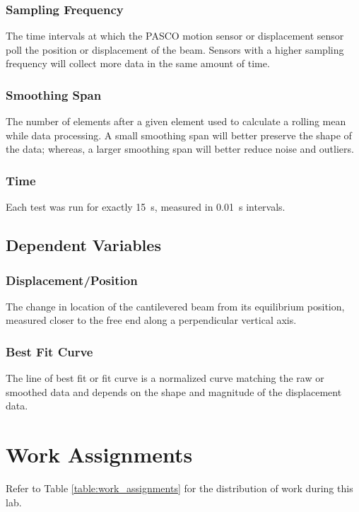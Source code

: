 \documentclass[12 pt]{report}
\begin{document}
\subsubsection{Sampling Frequency} \label{variables-independent_variables-sampling_frequency}
The time intervals at which the PASCO motion sensor or displacement sensor poll the position or displacement of the beam. Sensors with a higher sampling frequency will collect more data in the same amount of time.

\subsubsection{Smoothing Span} \label{variables-independent_variables-smoothing_span}
The number of elements after a given element used to calculate a rolling mean while data processing. A small smoothing span will better preserve the shape of the data; whereas, a larger smoothing span will better reduce noise and outliers.

\subsubsection{Time} \label{variables-independent_variables-time}
Each test was run for exactly \qty{15}{\s}, measured in \qty{0.01}{\s} intervals.

\subsection{Dependent Variables} \label{variables-dependent_variables}
\subsubsection{Displacement/Position} \label{variables-dependent_variables-displacement-position}
The change in location of the cantilevered beam from its equilibrium position, measured closer to the free end along a perpendicular vertical axis.

\subsubsection{Best Fit Curve} \label{variables-dependent_variablesbest_fit_curve}
The line of best fit or fit curve is a normalized curve matching the raw or smoothed data and depends on the shape and magnitude of the displacement data.

\section{Work Assignments} \label{work_assignments}
Refer to Table \ref{table:work_assignments} for the distribution of work during this lab.
\end{document}
